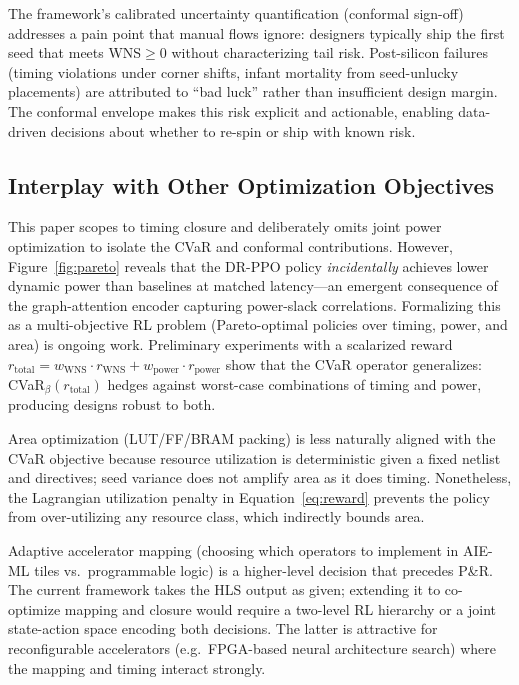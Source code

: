 \documentclass[journal,onecolumn=false]{IEEEtran}
\begin{document}
The framework's calibrated uncertainty quantification (conformal sign-off) addresses a pain point that manual flows ignore: designers typically ship the first seed that meets WNS${\geq}0$ without characterizing tail risk. Post-silicon failures (timing violations under corner shifts, infant mortality from seed-unlucky placements) are attributed to ``bad luck'' rather than insufficient design margin. The conformal envelope makes this risk explicit and actionable, enabling data-driven decisions about whether to re-spin or ship with known risk.

\subsection{Interplay with Other Optimization Objectives}

This paper scopes to timing closure and deliberately omits joint power optimization to isolate the CVaR and conformal contributions. However, Figure~\ref{fig:pareto} reveals that the DR-PPO policy \emph{incidentally} achieves lower dynamic power than baselines at matched latency—an emergent consequence of the graph-attention encoder capturing power-slack correlations. Formalizing this as a multi-objective RL problem (Pareto-optimal policies over timing, power, and area) is ongoing work. Preliminary experiments with a scalarized reward $r_{\text{total}} = w_{\text{WNS}} \cdot r_{\text{WNS}} + w_{\text{power}} \cdot r_{\text{power}}$ show that the CVaR operator generalizes: CVaR$_\beta(r_{\text{total}})$ hedges against worst-case combinations of timing and power, producing designs robust to both.

Area optimization (LUT/FF/BRAM packing) is less naturally aligned with the CVaR objective because resource utilization is deterministic given a fixed netlist and directives; seed variance does not amplify area as it does timing. Nonetheless, the Lagrangian utilization penalty in Equation~\eqref{eq:reward} prevents the policy from over-utilizing any resource class, which indirectly bounds area.

Adaptive accelerator mapping (choosing which operators to implement in AIE-ML tiles vs.\ programmable logic) is a higher-level decision that precedes P\&R. The current framework takes the HLS output as given; extending it to co-optimize mapping and closure would require a two-level RL hierarchy or a joint state-action space encoding both decisions. The latter is attractive for reconfigurable accelerators (e.g.\ FPGA-based neural architecture search) where the mapping and timing interact strongly.
\end{document}
